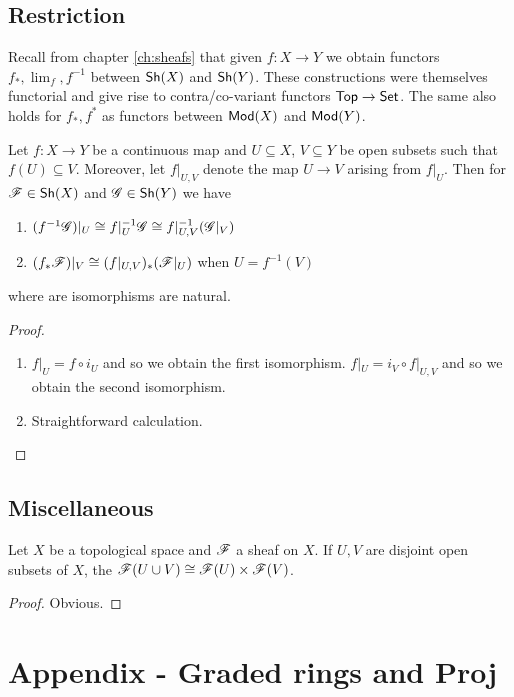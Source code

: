 \documentclass{memoir}
\begin{document}
\section{Restriction}
\begin{remark}
    Recall from chapter \ref{ch:sheafs} that given $f:X\to Y$ we obtain functors $f_*,\lim_f,f^{-1}$ between ${\normalfont\mathsf{Sh}}(X)$ and ${\normalfont\mathsf{Sh}}(Y)$.
    These constructions were themselves functorial and give rise to contra/co-variant functors ${\normalfont\mathsf{Top}}\to {\normalfont\mathsf{Set}}$.
    The same also holds for $f_*,f^*$ as functors between ${\normalfont\mathsf{Mod}}(X)$ and ${\normalfont\mathsf{Mod}}(Y)$.
\end{remark}
\begin{thm}
    Let $f:X\to Y$ be a continuous map and $U\subseteq X$, $V\subseteq Y$ be open subsets such that $f(U)\subseteq V$.
    Moreover, let $f|_{U,V}$ denote the map $U\to V$ arising from $f|_U$.
    Then for $\mathscr{F}\in {\normalfont\mathsf{Sh}}(X)$ and $\mathscr{G}\in {\normalfont\mathsf{Sh}}(Y)$ we have
    \begin{enumerate}
        \item $(f^{-1}\mathscr{G})|_U \cong f|_U^{-1}\mathscr{G} \cong f|_{U,V}^{-1}(\mathscr{G}|_V)$
        \item $(f_*\mathscr{F})|_V \cong (f|_{U,V})_*(\mathscr{F}|_U)$ when $U = f^{-1}(V)$
    \end{enumerate}
    where are isomorphisms are natural.
\end{thm}
\begin{proof}
    \begin{enumerate}
        \item $f|_U = f \circ i_U$ and so we obtain the first isomorphism.
            $f|_U = i_V \circ f|_{U,V}$ and so we obtain the second isomorphism.
        \item Straightforward calculation.
    \end{enumerate}
\end{proof}
\section{Miscellaneous}
\begin{proposition}
    Let $X$ be a topological space and $\mathscr{F}$ a sheaf on $X$.
    If $U,V$ are disjoint open subsets of $X$, the $\mathscr{F}(U\cup V) \cong \mathscr{F}(U)\times \mathscr{F}(V)$.
\end{proposition}
\begin{proof}
    Obvious.
\end{proof}
\chapter{Appendix - Graded rings and Proj}
\end{document}
